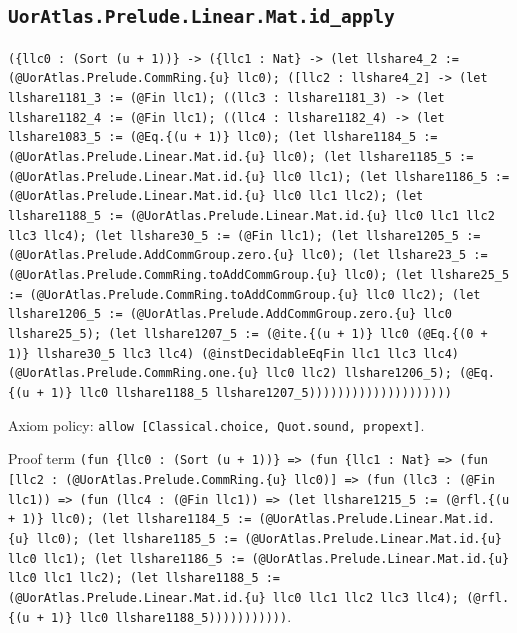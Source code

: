 \documentclass[11pt]{article}
\begin{document}
\subsection*{\texttt{UorAtlas.Prelude.Linear.Mat.id\_apply}}
\noindent\texttt{(\{llc0 : (Sort (u + 1))\} -> (\{llc1 : Nat\} -> (let llshare4\_2 := (@UorAtlas.Prelude.CommRing.\{u\} llc0); ([llc2 : llshare4\_2] -> (let llshare1181\_3 := (@Fin llc1); ((llc3 : llshare1181\_3) -> (let llshare1182\_4 := (@Fin llc1); ((llc4 : llshare1182\_4) -> (let llshare1083\_5 := (@Eq.\{(u + 1)\} llc0); (let llshare1184\_5 := (@UorAtlas.Prelude.Linear.Mat.id.\{u\} llc0); (let llshare1185\_5 := (@UorAtlas.Prelude.Linear.Mat.id.\{u\} llc0 llc1); (let llshare1186\_5 := (@UorAtlas.Prelude.Linear.Mat.id.\{u\} llc0 llc1 llc2); (let llshare1188\_5 := (@UorAtlas.Prelude.Linear.Mat.id.\{u\} llc0 llc1 llc2 llc3 llc4); (let llshare30\_5 := (@Fin llc1); (let llshare1205\_5 := (@UorAtlas.Prelude.AddCommGroup.zero.\{u\} llc0); (let llshare23\_5 := (@UorAtlas.Prelude.CommRing.toAddCommGroup.\{u\} llc0); (let llshare25\_5 := (@UorAtlas.Prelude.CommRing.toAddCommGroup.\{u\} llc0 llc2); (let llshare1206\_5 := (@UorAtlas.Prelude.AddCommGroup.zero.\{u\} llc0 llshare25\_5); (let llshare1207\_5 := (@ite.\{(u + 1)\} llc0 (@Eq.\{(0 + 1)\} llshare30\_5 llc3 llc4) (@instDecidableEqFin llc1 llc3 llc4) (@UorAtlas.Prelude.CommRing.one.\{u\} llc0 llc2) llshare1206\_5); (@Eq.\{(u + 1)\} llc0 llshare1188\_5 llshare1207\_5))))))))))))))))))))}\par
\noindent Axiom policy: \texttt{allow [Classical.choice, Quot.sound, propext]}.\par
\noindent Proof term \texttt{(fun \{llc0 : (Sort (u + 1))\} => (fun \{llc1 : Nat\} => (fun [llc2 : (@UorAtlas.Prelude.CommRing.\{u\} llc0)] => (fun (llc3 : (@Fin llc1)) => (fun (llc4 : (@Fin llc1)) => (let llshare1215\_5 := (@rfl.\{(u + 1)\} llc0); (let llshare1184\_5 := (@UorAtlas.Prelude.Linear.Mat.id.\{u\} llc0); (let llshare1185\_5 := (@UorAtlas.Prelude.Linear.Mat.id.\{u\} llc0 llc1); (let llshare1186\_5 := (@UorAtlas.Prelude.Linear.Mat.id.\{u\} llc0 llc1 llc2); (let llshare1188\_5 := (@UorAtlas.Prelude.Linear.Mat.id.\{u\} llc0 llc1 llc2 llc3 llc4); (@rfl.\{(u + 1)\} llc0 llshare1188\_5)))))))))))}.\par
\end{document}
